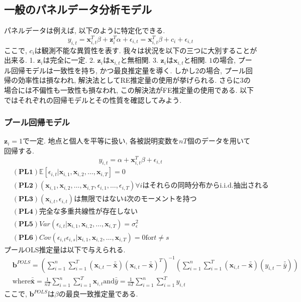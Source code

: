 \documentclass[paper=a4paper,fontsize=10pt]{jlreq}
\begin{document}
\subsection{一般のパネルデータ分析モデル}
パネルデータは例えば, 以下のように特定化できる.
\begin{equation*}
 y_{i,t} = \mathbf{x}_{i,t}^T \beta + \mathbf{z}_{i}^T \alpha + \epsilon_{i,t} = \mathbf{x}_{i,t}^T \beta + c_i + \epsilon_{i,t}
\end{equation*}
ここで, $c_i$は観測不能な異質性を表す. 我々は状況を以下の三つに大別することが出来る. 1. $\mathbf{z}_i$は完全に一定. 2. $\mathbf{z}_i$は$\mathbf{x}_{i,t}$と無相関. 3. $\mathbf{z}_i$は$\mathbf{x}_{i,t}$と相関. $1$の場合, プール回帰モデルは一致性を持ち, かつ最良推定量を導く. しかし$2$の場合, プール回帰の効率性は損なわれ, 解決法としてRE推定量の使用が挙げられる. さらに$3$の場合には不偏性も一致性も損なわれ, この解決法がFE推定量の使用である. 以下ではそれぞれの回帰モデルとその性質を確認してみよう.

\subsubsection{プール回帰モデル}
$\mathbf{z}_{i} = 1$で一定. 地点と個人を平等に扱い, 各被説明変数を$nT$個のデータを用いて回帰する. 
\begin{equation*}
  y_{i,t} = \alpha + \mathbf{x}_{i,t}^T \beta + \epsilon_{i,t}
\end{equation*}
\begin{align*}
  &\mathbf{(PL1)}　\mathbb{E}[\epsilon_{i,t}|\mathbf{x}_{i,1}, \mathbf{x}_{i,2}, \dots, \mathbf{x}_{i,T}]=0\\
  &\mathbf{(PL2)}　(\mathbf{x}_{i,1}, \mathbf{x}_{i,2}, \dots, \mathbf{x}_{i,T}, \epsilon_{i,1}, \dots, \epsilon_{i,T}) \forall i\text{はそれらの同時分布からi.i.d.抽出される}\\
  &\mathbf{(PL3)}　(\mathbf{x}_{i,t}, \epsilon_{i,t})\text{は無限ではない4次のモーメントを持つ}\\
  &\mathbf{(PL4)}　\text{完全な多重共線性が存在しない}\\
  &\mathbf{(PL5)}　Var(\epsilon_{i,t}|\mathbf{x}_{i,1}, \mathbf{x}_{i,2}, \dots, \mathbf{x}_{i,T}) = \sigma_\epsilon^2\\
  &\mathbf{(PL6)}　Cov(\epsilon_{i,t}\epsilon_{i,s}|\mathbf{x}_{i,1}, \mathbf{x}_{i,2}, \dots, \mathbf{x}_{i,T}) = 0　\text{for}　t \neq s
\end{align*}
プールOLS推定量は以下で与えられる.
\begin{align*}
  &\mathbf{b}^{POLS} = (\sum_{i=1}^{n}\sum_{i=1}^{T}(\mathbf{x}_{i,t} - \bar{\bar{\mathbf{x}}})(\mathbf{x}_{i,t} - \bar{\bar{\mathbf{x}}})^T)^{-1} (\sum_{i=1}^{n}\sum_{i=1}^{T}(\mathbf{x}_{i,t} - \bar{\bar{\mathbf{x}}})(y_{i,t} - \bar{\bar{y}}))\\
  &\text{where}　\bar{\bar{\mathbf{x}}} = \frac{1}{nT}\sum_{i=1}^{n}\sum_{i=1}^{T}\mathbf{x}_{i,t}　\text{and}　\bar{\bar{y}} = \frac{1}{nT}\sum_{i=1}^{n}\sum_{i=1}^{T}y_{i,t}
\end{align*}
ここで, $\mathbf{b}^{POLS}$は$\beta$の最良一致推定量である.
\end{document}
